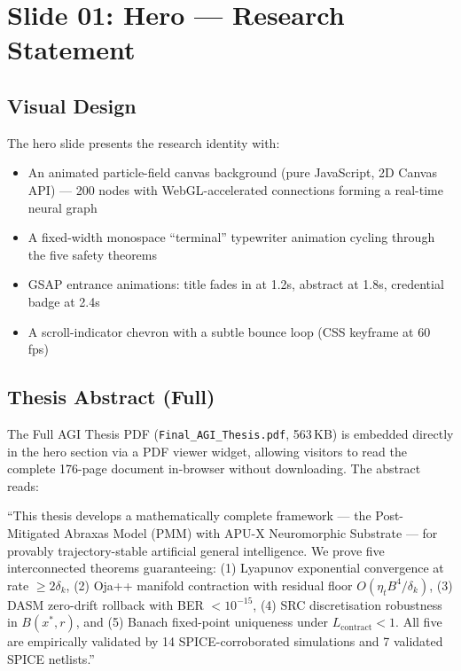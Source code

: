 \documentclass[12pt, a4paper]{article}
\begin{document}
\section{Slide 01: Hero — Research Statement}
\label{sec:slide01}

\subsection{Visual Design}

The hero slide presents the research identity with:
\begin{itemize}[noitemsep]
  \item An animated particle-field canvas background (pure JavaScript, 2D Canvas API) — 200 nodes with WebGL-accelerated connections forming a real-time neural graph
  \item A fixed-width monospace ``terminal'' typewriter animation cycling through the five safety theorems
  \item GSAP entrance animations: title fades in at 1.2s, abstract at 1.8s, credential badge at 2.4s
  \item A scroll-indicator chevron with a subtle bounce loop (CSS keyframe at 60 fps)
\end{itemize}

\subsection{Thesis Abstract (Full)}

The Full AGI Thesis PDF (\texttt{Final\_AGI\_Thesis.pdf}, 563\,KB) is embedded directly
in the hero section via a PDF viewer widget, allowing visitors to read the complete
176-page document in-browser without downloading. The abstract reads:

\begin{cyanbox}
\small
``This thesis develops a mathematically complete framework — the Post-Mitigated Abraxas
Model (PMM) with APU-X Neuromorphic Substrate — for provably trajectory-stable artificial
general intelligence. We prove five interconnected theorems guaranteeing: (1) Lyapunov
exponential convergence at rate $\geq 2\delta_k$, (2) Oja++ manifold contraction with
residual floor $O(\eta_t B^4/\delta_k)$, (3) DASM zero-drift rollback with BER
$< 10^{-15}$, (4) SRC discretisation robustness in $B(x^*, r)$, and (5) Banach
fixed-point uniqueness under $L_{\text{contract}} < 1$. All five are empirically
validated by 14 SPICE-corroborated simulations and 7 validated SPICE netlists.''
\end{cyanbox}
\end{document}
